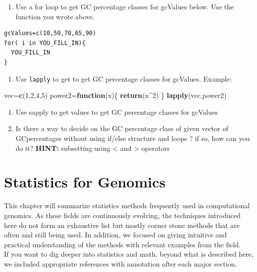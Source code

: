 \documentclass[12pt,]{krantz}
\newenvironment{Shaded}{\begin{snugshade}}{\end{snugshade}}
\newcommand{\ControlFlowTok}[1]{\textcolor[rgb]{0.13,0.29,0.53}{\textbf{#1}}}
\newcommand{\DecValTok}[1]{\textcolor[rgb]{0.00,0.00,0.81}{#1}}
\newcommand{\KeywordTok}[1]{\textcolor[rgb]{0.13,0.29,0.53}{\textbf{#1}}}
\newcommand{\NormalTok}[1]{#1}
\newcommand{\OperatorTok}[1]{\textcolor[rgb]{0.81,0.36,0.00}{\textbf{#1}}}
\providecommand{\tightlist}{%
  \setlength{\itemsep}{0pt}\setlength{\parskip}{0pt}}
\begin{document}
\begin{enumerate}
\def\labelenumi{\arabic{enumi}.}
\setcounter{enumi}{43}
\tightlist
\item
  Use a for loop to get GC percentage classes for gcValues below. Use the function
  you wrote above.
\end{enumerate}

\begin{verbatim}
gcValues=c(10,50,70,65,90)
for( i in YOU_FILL_IN){
  YOU_FILL_IN
}
\end{verbatim}

\begin{enumerate}
\def\labelenumi{\arabic{enumi}.}
\setcounter{enumi}{43}
\tightlist
\item
  Use \texttt{lapply} to get to get GC percentage classes for gcValues. Example:
\end{enumerate}

\begin{Shaded}
\begin{Highlighting}[]
\NormalTok{vec=}\KeywordTok{c}\NormalTok{(}\DecValTok{1}\NormalTok{,}\DecValTok{2}\NormalTok{,}\DecValTok{4}\NormalTok{,}\DecValTok{5}\NormalTok{)}
\NormalTok{power2=}\ControlFlowTok{function}\NormalTok{(x)\{ }\KeywordTok{return}\NormalTok{(x}\OperatorTok{^}\DecValTok{2}\NormalTok{)  \}}
    \KeywordTok{lapply}\NormalTok{(vec,power2)}
\end{Highlighting}
\end{Shaded}

\begin{enumerate}
\def\labelenumi{\arabic{enumi}.}
\setcounter{enumi}{43}
\item
  Use sapply to get values to get GC percentage classes for gcValues
\item
  Is there a way to decide on the GC percentage class of given vector of GCpercentages
  without using if/else structure and loops ? if so, how can you do it?
  \textbf{HINT:} subsetting using \textless{} and \textgreater{} operators
\end{enumerate}

\hypertarget{stats}{%
\chapter{Statistics for Genomics}\label{stats}}

This chapter will summarize statistics methods frequently used
in computational genomics. As these fields are continuously evolving, the
techniques introduced here do not form an exhaustive list but mostly corner
stone methods
that are often and still being used. In addition, we focused on giving intuitive and
practical understanding of the methods with relevant examples from the field.\\
If you want to dig deeper into statistics and math, beyond what is described
here, we included appropriate references with annotation after each major
section.
\end{document}
